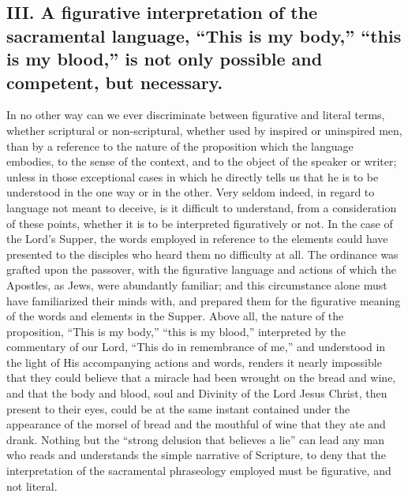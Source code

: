 \documentclass[]{book}
\begin{document}
\hypertarget{iii.-a-figurative-interpretation-of-the-sacramental-language-this-is-my-body-this-is-my-blood-is-not-only-possible-and-competent-but-necessary.}{%
\subsection{III. A figurative interpretation of the sacramental language, ``This is my body,'' ``this is my blood,'' is not only possible and competent, but necessary.}\label{iii.-a-figurative-interpretation-of-the-sacramental-language-this-is-my-body-this-is-my-blood-is-not-only-possible-and-competent-but-necessary.}}

In no other way can we ever discriminate between figurative and literal terms, whether scriptural or non-scriptural, whether used by inspired or uninspired men, than by a reference to the nature of the proposition which the language embodies, to the sense of the context, and to the object of the speaker or writer; unless in those exceptional cases in which he directly tells us that he is to be understood in the one way or in the other. Very seldom indeed, in regard to language not meant to deceive, is it difficult to understand, from a consideration of these points, whether it is to be interpreted figuratively or not. In the case of the Lord's Supper, the words employed in reference to the elements could have presented to the disciples who heard them no difficulty at all. The ordinance was grafted upon the passover, with the figurative language and actions of which the Apostles, as Jews, were abundantly familiar; and this circumstance alone must have familiarized their minds with, and prepared them for the figurative meaning of the words and elements in the Supper. Above all, the nature of the proposition, ``This is my body,'' ``this is my blood,'' interpreted by the commentary of our Lord, ``This do in remembrance of me,'' and understood in the light of His accompanying actions and words, renders it nearly impossible that they could believe that a miracle had been wrought on the bread and wine, and that the body and blood, soul and Divinity of the Lord Jesus Christ, then present to their eyes, could be at the same instant contained under the appearance of the morsel of bread and the mouthful of wine that they ate and drank. Nothing but the ``strong delusion that believes a lie'' can lead any man who reads and understands the simple narrative of Scripture, to deny that the interpretation of the sacramental phraseology employed must be figurative, and not literal.
\end{document}
